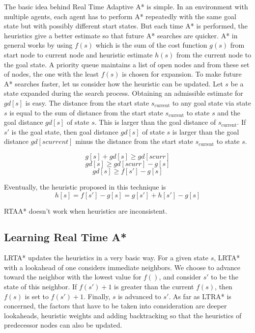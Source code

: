 \documentclass[tog]{acmsiggraph}
\begin{document}
The basic idea behind Real Time Adaptive A* is simple. In an
environment with multiple agents, each agent has to perform A*
repeatedly with the same goal state but with possibly different start
states. But each time A* is performed, the heuristics give a better
estimate so that future A* searches are quicker. \cite{koenig2006real} A* in general works
by using \(f(s)\) which is the sum of the cost function \(g(s)\) from
start node to current node and heuristic estimate \(h(s)\) from the
current node to the goal state. A priority queue maintains a list of
open nodes and from these set of nodes, the one with the least
\(f(s)\) is chosen for expansion. To make future A* searches faster,
let us consider how the heuristic can be updated. Let \(s\) be a state
expanded during the search process. Obtaining an admissible estimate
for \(gd[s]\) is easy. The distance from the start state
\(s_\text{current}\) to any goal state via state \(s\) is equal to the
sum of distance from the start state \(s_\text{current}\) to state
\(s\) and the goal distance \(gd[s]\) of state \(s\). This is larger
than the goal distance of \(s_\text{current}\). If \(s'\) is the goal
state, then goal distance \(gd[s]\) of state \(s\) is larger than the
goal distance \(gd[scurrent]\) minus the distance from the start state
\(s_\text{current}\) to state \(s\).

\[ g[s] + gd[s] \geq gd[scurr] \]
\[ gd[s] \geq gd[scurr] - g[s] \]
\[ gd[s] \geq f[s'] - g[s] \]

Eventually, the heuristic proposed in this technique is
\[ h[s] = f[s'] - g[s] = g[s'] + h[s'] - g[s] \]

RTAA* doesn’t work when heuristics are inconsistent.

\subsection{Learning Real Time A*}

LRTA* updates the heuristics in a very basic way. For a given state
\(s\), LRTA* with a lookahead of one considers immediate neighbors. We
choose to advance toward the neighbor with the lowest value for
\(f()\), and consider \(s'\) to be the state of this neighbor. If
\(f(s') + 1\) is greater than the current \(f(s)\), then \(f(s)\) is
set to \(f(s') + 1\). Finally, \(s\) is advanced to \(s'\). As far as
LTRA* is concerned, the factors that have to be taken into
consideration are deeper lookaheads, heuristic weights and adding
backtracking so that the heuristics of predecessor nodes can also be
updated.
\end{document}
